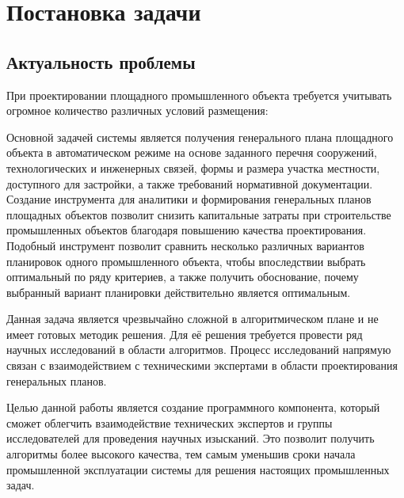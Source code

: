 \section*{\Large{Постановка задачи}}


\subsection*{\large{Актуальность проблемы}}

При проектировании площадного промышленного объекта требуется учитывать огромное количество различных
условий размещения:


Основной задачей системы является получения генерального
плана площадного объекта в автоматическом режиме
на основе заданного перечня сооружений,
технологических и инженерных связей, формы и размера участка местности,
доступного для застройки, а также требований нормативной документации.
Создание инструмента для аналитики и формирования генеральных планов
площадных объектов позволит снизить капитальные затраты
при строительстве промышленных объектов благодаря повышению качества проектирования.
Подобный инструмент позволит сравнить несколько различных вариантов планировок
одного промышленного объекта, чтобы впоследствии выбрать оптимальный по ряду критериев,
а также получить обоснование, почему выбранный вариант планировки действительно является оптимальным.




Данная задача является чрезвычайно сложной в алгоритмическом плане и не имеет готовых методик решения.
Для её решения требуется провести ряд научных исследований в области алгоритмов.
Процесс исследований напрямую связан с взаимодействием
с техническими экспертами в области проектирования генеральных планов.


Целью данной работы является создание программного компонента, который сможет облегчить взаимодействие 
технических экспертов и группы исследователей для проведения научных изысканий. 
Это позволит получить алгоритмы более высокого качества, 
тем самым уменьшив сроки начала промышленной эксплуатации системы для решения настоящих промышленных задач.